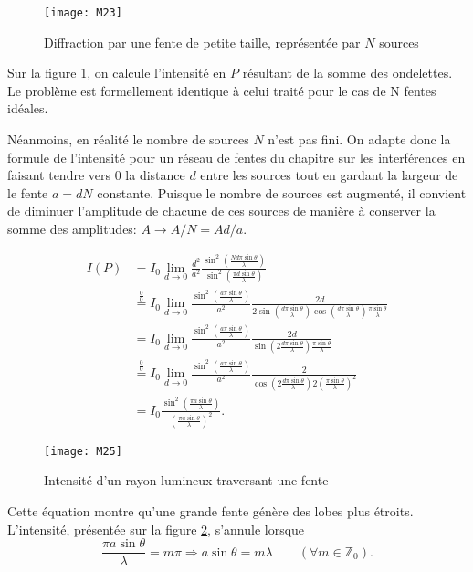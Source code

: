 \begin{figure}[h]
    \centering
    \texttt{[image: M23]}
    \caption{Diffraction par une fente de petite taille, représentée par $N$ sources}
    \label{f2}
\end{figure}

\noindent Sur la figure \ref{f2}, on calcule l'intensité en $P$ résultant de la somme des ondelettes. Le problème est formellement identique à celui traité pour le cas de N fentes idéales.

\noindent Néanmoins, en réalité le nombre de sources $N$ n'est pas fini. On adapte donc la formule de l'intensité pour un réseau de fentes du chapitre sur les interférences en faisant tendre vers $0$ la distance $d$ entre les sources tout en gardant la largeur de le fente $a=dN$ constante. Puisque le nombre de sources est augmenté, il convient de diminuer l'amplitude de chacune de ces sources de manière à conserver la somme des amplitudes: $A \rightarrow A/N=Ad/a$.

\begin{align*}
I(P) & =I_0\lim_{d\to 0} \frac{d^2}{a^2}\frac{\sin^2(\frac{Nd\pi \sin\theta}{\lambda})}{\sin^2(\frac{\pi d\sin\theta}{\lambda})}\\
& \overset{\frac{0}{0}}{=} I_0\lim_{d\to 0} \frac{\sin^2(\frac{a\pi \sin\theta}{\lambda})}{a^2}\frac{2d}{2\sin(\frac{d\pi \sin\theta}{\lambda})\cos(\frac{d\pi \sin\theta}{\lambda})\frac{\pi \sin\theta}{\lambda}}\\
& =I_0 \lim_{d\to 0} \frac{\sin^2(\frac{a\pi \sin\theta}{\lambda})}{a^2}\frac{2d}{\sin(2\frac{d\pi \sin\theta}{\lambda})\frac{\pi \sin\theta}{\lambda}}\\
& \overset{\frac{0}{0}}{=}I_0 \lim_{d\to 0} \frac{\sin^2(\frac{a\pi \sin\theta}{\lambda})}{a^2}\frac{2}{\cos(2\frac{d\pi \sin\theta}{\lambda})2(\frac{\pi \sin\theta}{\lambda})^2}\\
& =I_0 \frac{\sin^2(\frac{\pi a \sin\theta}{\lambda})}{(\frac{\pi a \sin\theta}{\lambda})^2}.
\end{align*}

\begin{figure}[h]
\texttt{[image: M25]}
\caption{Intensité d'un rayon lumineux traversant une fente}
\label{f3}
\end{figure}

\noindent Cette équation montre qu'une grande fente génère des lobes plus étroits. L'intensité, présentée sur la figure \ref{f3}, s'annule lorsque
$$
  \frac{\pi a \sin\theta}{\lambda}=m\pi \Rightarrow a \sin\theta = m\lambda \qquad(\forall m\in  \mathbb{Z}_0).
$$

